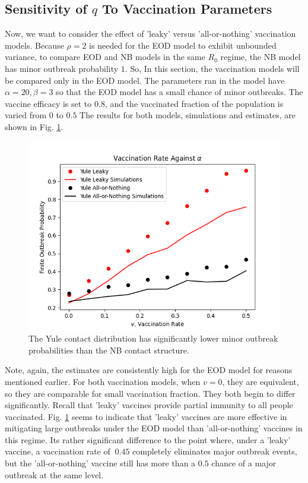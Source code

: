 \documentclass[11pt, twocolumn]{article}
\begin{document}
\subsection*{Sensitivity of $q$ To Vaccination Parameters}
Now, we want to consider the effect of 'leaky' versus 'all-or-nothing' vaccination models. Because $\rho=2$ is needed for the EOD model to exhibit unbounded variance, to compare EOD and NB models in the same $R_0$ regime, the NB model has minor outbreak probability $1$. So, In this section, the vaccination models will be compared only in the EOD model. The parameters ran in the model have $\alpha=20, \beta=3$ so that the EOD model has a small chance of minor outbreaks. The vaccine efficacy is set to $0.8$, and the vaccinated fraction of the population is varied from $0$ to $0.5$ The results for both models, simulations and estimates, are shown in Fig. \ref{fig:vacccomp}.

\begin{figure}
	\centering
	\includegraphics[scale=0.5]{YuleVaccComparison.png}
	\caption{The Yule contact distribution has significantly lower minor outbreak probabilities than the NB contact structure.}
	\label{fig:vacccomp}
\end{figure}

Note, again, the estimates are consistently high for the EOD model for reasons mentioned earlier. For both vaccination models, when $v=0$, they are equivalent, so they are comparable for small vaccination fraction. They both begin to differ significantly. Recall that 'leaky' vaccines provide partial immunity to all people vaccinated. Fig. \ref{fig:vacccomp} seems to indicate that 'leaky' vaccines are more effective in mitigating large outbreaks under the EOD model than 'all-or-nothing' vaccines in this regime. Its rather significant difference to the point where, under a 'leaky' vaccine, a vaccination rate of $~0.45$ completely eliminates major outbreak events, but the 'all-or-nothing' vaccine still has more than a $0.5$ chance of a major outbreak at the same level.
\end{document}
